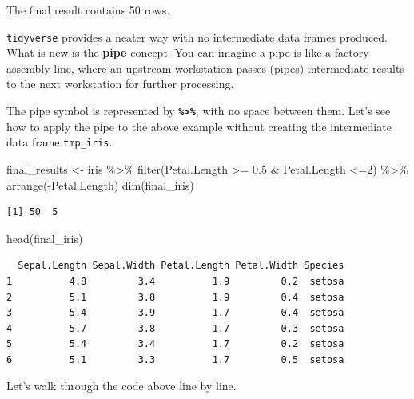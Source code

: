 \documentclass[
  letterpaper,
  DIV=11,
  numbers=noendperiod]{scrreprt}
\newenvironment{Shaded}{\begin{snugshade}}{\end{snugshade}}
\newcommand{\DecValTok}[1]{\textcolor[rgb]{0.68,0.00,0.00}{#1}}
\newcommand{\FloatTok}[1]{\textcolor[rgb]{0.68,0.00,0.00}{#1}}
\newcommand{\FunctionTok}[1]{\textcolor[rgb]{0.28,0.35,0.67}{#1}}
\newcommand{\NormalTok}[1]{\textcolor[rgb]{0.00,0.23,0.31}{#1}}
\newcommand{\OtherTok}[1]{\textcolor[rgb]{0.00,0.23,0.31}{#1}}
\newcommand{\SpecialCharTok}[1]{\textcolor[rgb]{0.37,0.37,0.37}{#1}}
\begin{document}
The final result contains 50 rows.

\texttt{tidyverse} provides a neater way with no intermediate data
frames produced. What is new is the \textbf{pipe} concept. You can
imagine a pipe is like a factory assembly line, where an upstream
workstation passes (pipes) intermediate results to the next workstation
for further processing.

The pipe symbol is represented by \textbf{\texttt{\%\textgreater{}\%}},
with no space between them. Let's see how to apply the pipe to the above
example without creating the intermediate data frame \texttt{tmp\_iris}.

\begin{Shaded}
\begin{Highlighting}[]
\NormalTok{final\_results }\OtherTok{\textless{}{-}}\NormalTok{ iris }\SpecialCharTok{\%\textgreater{}\%} 
                   \FunctionTok{filter}\NormalTok{(Petal.Length }\SpecialCharTok{\textgreater{}=} \FloatTok{0.5} \SpecialCharTok{\&}\NormalTok{ Petal.Length }\SpecialCharTok{\textless{}=}\DecValTok{2}\NormalTok{) }\SpecialCharTok{\%\textgreater{}\%}
                   \FunctionTok{arrange}\NormalTok{(}\SpecialCharTok{{-}}\NormalTok{Petal.Length)}
\FunctionTok{dim}\NormalTok{(final\_iris)}
\end{Highlighting}
\end{Shaded}

\begin{verbatim}
[1] 50  5
\end{verbatim}

\begin{Shaded}
\begin{Highlighting}[]
\FunctionTok{head}\NormalTok{(final\_iris)}
\end{Highlighting}
\end{Shaded}

\begin{verbatim}
  Sepal.Length Sepal.Width Petal.Length Petal.Width Species
1          4.8         3.4          1.9         0.2  setosa
2          5.1         3.8          1.9         0.4  setosa
3          5.4         3.9          1.7         0.4  setosa
4          5.7         3.8          1.7         0.3  setosa
5          5.4         3.4          1.7         0.2  setosa
6          5.1         3.3          1.7         0.5  setosa
\end{verbatim}

Let's walk through the code above line by line.
\end{document}
